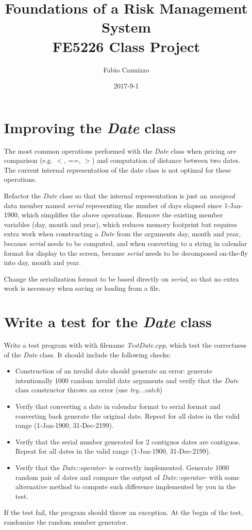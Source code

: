 \documentclass[10pt]{article}
\title{Foundations of a Risk Management System \\
\large FE5226 Class Project
}
\author{Fabio Cannizzo}
\date{2017-9-1}
\begin{document}
\maketitle

\section{Improving the \textit{Date} class}
The most common operations performed with the \textit{Date} class when pricing are comparison (e.g. $<$, ==, $>$) and computation of distance between two dates. The current internal representation of the date class is not optimal for these operations.

Refactor the \textit{Date} class so that the internal representation is just an \textit{unsigned} data member named \textit{serial} representing the number of days elapsed since 1-Jan-1900, which simplifies the above operations. Remove the existing member variables (day, month and year), which reduces memory footprint but requires extra work when constructing a \textit{Date} from the arguments day, month and year, because \textit{serial} needs to be computed, and when converting to a string in calendar format for display to the screen, because \textit{serial} needs to be decomposed on-the-fly into day, month and year.

Change the serialization format to be based directly on \textit{serial}, so that no extra work is necessary when saving or loading from a file.

\section{Write a test for the \textit{Date} class}
Write a test program with with filename \textit{TestDate.cpp}, which test the correctness of the \textit{Date} class. It should include the following checks:
\begin{itemize}
\item Construction of an invalid date should generate an error: generate intentionally 1000 random invalid date arguments and verify that the \textit{Date} class constructor throws an error (use \textit{try...catch})
\item Verify that converting a date in calendar format to serial format and converting back generate the original date. Repeat for all dates in the valid range (1-Jan-1900, 31-Dec-2199).
\item Verify that the serial number generated for 2 contiguos dates are contiguos. Repeat for all dates in the valid range (1-Jan-1900, 31-Dec-2199).
\item Verify that the \textit{Date::operator-} is correctly implemented. Generate 1000 random pair of dates and compare the output of \textit{Date::operator-} with some alternative method to compute such difference implemented by you in the test.
\end{itemize}
If the test fail, the program should throw an exception. At the begin of the test, randomize the random number generator.
\end{document}
